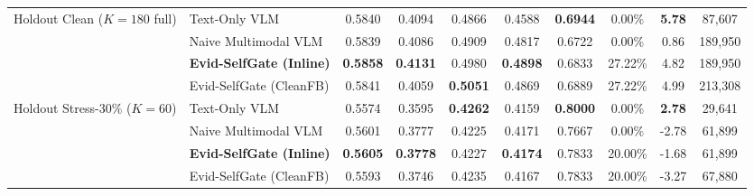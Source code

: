 \begin{table}[t]
{\begin{tabular}{llcccccccc}
\midrule
\multirow{4}{*}{Holdout Clean ($K=180$ full)}
& Text-Only VLM & 0.5840 & 0.4094 & 0.4866 & 0.4588 & \textbf{0.6944} & 0.00\% & \textbf{5.78} & 87,607 \\
& Naive Multimodal VLM & 0.5839 & 0.4086 & 0.4909 & 0.4817 & 0.6722 & 0.00\% & 0.86 & 189,950 \\
& \textbf{Evid-SelfGate (Inline)} & \textbf{0.5858} & \textbf{0.4131} & 0.4980 & \textbf{0.4898} & 0.6833 & 27.22\% & 4.82 & 189,950 \\
& Evid-SelfGate (CleanFB) & 0.5841 & 0.4059 & \textbf{0.5051} & 0.4869 & 0.6889 & 27.22\% & 4.99 & 213,308 \\
\midrule
\multirow{4}{*}{Holdout Stress-30\% ($K=60$)}
& Text-Only VLM & 0.5574 & 0.3595 & \textbf{0.4262} & 0.4159 & \textbf{0.8000} & 0.00\% & \textbf{2.78} & 29,641 \\
& Naive Multimodal VLM & 0.5601 & 0.3777 & 0.4225 & 0.4171 & 0.7667 & 0.00\% & -2.78 & 61,899 \\
& \textbf{Evid-SelfGate (Inline)} & \textbf{0.5605} & \textbf{0.3778} & 0.4227 & \textbf{0.4174} & 0.7833 & 20.00\% & -1.68 & 61,899 \\
& Evid-SelfGate (CleanFB) & 0.5593 & 0.3746 & 0.4235 & 0.4167 & 0.7833 & 20.00\% & -3.27 & 67,880 \\
\bottomrule
\end{tabular}}
\end{table}

